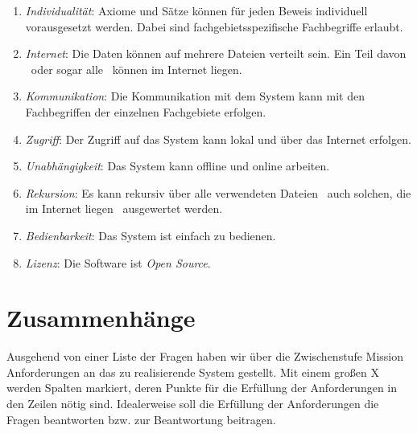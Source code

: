 \documentclass[english,ngerman,parskip=half,headsepline,footsepline]{scrreprt}
\begin{document}
\begin{enumerate}
		\item \label{Ziel:Individualität} \emph{Individualität}: Axiome und Sätze können für jeden Beweis individuell vorausgesetzt werden. Dabei sind fachgebietsspezifische Fachbegriffe erlaubt.
		
		\item \label{Ziel:Internet} \emph{Internet}: Die Daten können auf mehrere Dateien verteilt sein. Ein Teil davon \textendash\ oder sogar alle \textendash\ können im Internet liegen.
		
		\item \label{Ziel:Kommunikation} \emph{Kommunikation}: Die Kommunikation mit dem System kann mit den Fachbegriffen der einzelnen Fachgebiete erfolgen.
		
		\item \label{Ziel:Zugriff} \emph{Zugriff}: Der Zugriff auf das System kann lokal und über das Internet erfolgen.
		
		\item \label{Ziel:Unabhängigkeit} \emph{Unabhängigkeit}: Das System kann offline und online arbeiten.
		
		\item \label{Ziel:Rekursion} \emph{Rekursion}: Es kann rekursiv über alle verwendeten Dateien \textendash\ auch solchen, die im Internet liegen \textendash\ ausgewertet werden.
		
		\item \label{Ziel:Bedienbarkeit} \emph{Bedienbarkeit}: Das System ist einfach zu bedienen.
		
		\item \label{Ziel:Lizenz} \emph{Lizenz}: Die Software ist \emph{Open Source}.
		
	\end{enumerate}
	
	\section{Zusammenhänge}
    \label{sec:Zusammenhänge}

	Ausgehend von einer Liste der Fragen haben wir über die Zwischenstufe Mission Anforderungen an das zu realisierende System gestellt. Mit einem großen X werden Spalten markiert, deren Punkte für die Erfüllung der Anforderungen in den Zeilen nötig sind. Idealerweise soll die Erfüllung der Anforderungen die Fragen beantworten bzw. zur Beantwortung beitragen.\vspace{12pt}
	
\end{document}
